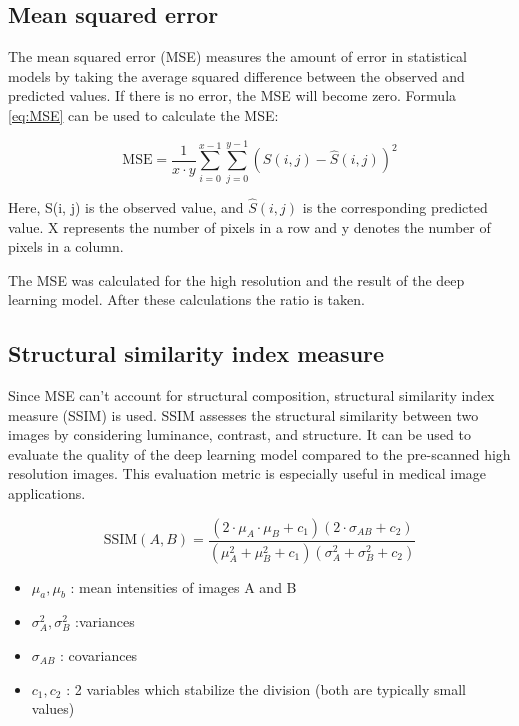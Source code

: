 \documentclass[twocolumn]{article}
\begin{document}
\subsection{Mean squared error}
The mean squared error (MSE) measures the amount of error in statistical models by taking the average squared difference between the observed and predicted values. 
If there is no error, the MSE will become zero. Formula \ref{eq:MSE} can be used to calculate the MSE: 

\begin{equation}\label{eq:MSE}
    \text{MSE} = \frac{1}{x \cdot y} \sum_{i=0}^{x-1} \sum_{j=0}^{y-1} \left( S(i, j) - \hat{S}(i, j) \right)^2
\end{equation}

Here, S(i, j) is the observed value, and $\hat{S}(i, j)$  is the corresponding predicted value. 
X represents the number of pixels in a row and y denotes the number of pixels in a column. \cite{mseJim}

The MSE was calculated for the high resolution and the result of the deep learning model. After these calculations the ratio is taken.

\subsection{Structural similarity index measure}
Since MSE can't account for structural composition, structural similarity index measure (SSIM) is used. 
SSIM assesses the structural similarity between two images by considering luminance, contrast, and structure. 
It can be used to evaluate the quality of the deep learning model compared to the pre-scanned high resolution images. 
This evaluation metric is especially useful in medical image applications.

\begin{equation}\label{eq:SSIM}
\text{SSIM}(A, B) = \frac{(2 \cdot \mu_A \cdot \mu_B + c_1)(2 \cdot \sigma_{AB} + c_2)}{(\mu_A^2 + \mu_B^2 + c_1)(\sigma_A^2 + \sigma_B^2 + c_2)}
\end{equation}

\begin{itemize}
    \item $\mu_a,\mu_b$ : mean intensities of images A and B
    \item $\sigma_A^2, \sigma_B^2$ :variances
    \item $\sigma_{AB}$ : covariances
    \item $c_1,c_2$ : 2 variables which stabilize the division (both are typically small values)
\end{itemize}
\end{document}
